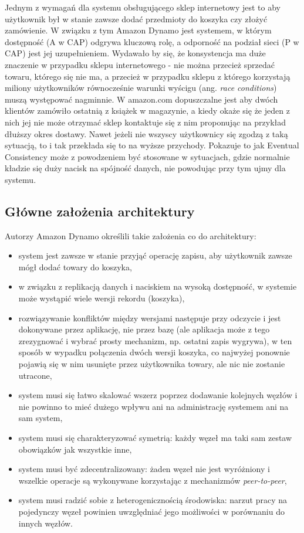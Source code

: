 Jednym z wymagań dla systemu obsługującego sklep internetowy jest to aby użytkownik był w stanie zawsze dodać przedmioty do koszyka czy złożyć zamówienie.
W związku z tym Amazon Dynamo jest systemem, w którym dostępność (A w CAP) odgrywa kluczową rolę, a odporność na podział sieci (P w CAP) jest jej uzupełnieniem.
Wydawało by się, że konsystencja ma duże znaczenie w przypadku sklepu internetowego - nie można przecież sprzedać towaru, którego się nie ma, a przecież w przypadku sklepu z którego korzystają miliony użytkowników równocześnie warunki wyścigu (ang. \emph{race conditions}) muszą występować nagminnie.
W amazon.com dopuszczalne jest aby dwóch klientów zamówiło ostatnią z książek w magazynie, a kiedy okaże się że jeden z nich jej nie może otrzymać sklep kontaktuje się z nim proponując na przykład dłuższy okres dostawy.
Nawet jeżeli nie wszyscy użytkownicy się zgodzą z taką sytuacją, to i tak przekłada się to na wyższe przychody.
Pokazuje to jak Eventual Consistency może z powodzeniem być stosowane w sytuacjach, gdzie normalnie kładzie się duży nacisk na spójność danych, nie powodując przy tym ujmy dla systemu.

\subsection*{Główne założenia architektury}

Autorzy Amazon Dynamo określili takie założenia co do architektury:

\begin{itemize}
 \item system jest zawsze w stanie przyjąć operację zapisu, aby użytkownik zawsze mógł dodać towary do koszyka,
 \item w związku z replikacją danych i naciskiem na wysoką dostępność, w systemie może wystąpić wiele wersji rekordu (koszyka),
 \item rozwiązywanie konfliktów między wersjami następuje przy odczycie i jest dokonywane przez aplikację, nie przez bazę (ale aplikacja może z tego zrezygnować i wybrać prosty mechanizm, np. ostatni zapis wygrywa), w ten sposób w wypadku połączenia dwóch wersji koszyka, co najwyżej ponownie pojawią się w nim usunięte przez użytkownika towary, ale nic nie zostanie utracone,
 \item system musi się łatwo skalować wszerz poprzez dodawanie kolejnych węzłów i nie powinno to mieć dużego wpływu ani na administrację systemem ani na sam system,
 \item system musi się charakteryzować symetrią: każdy węzeł ma taki sam zestaw obowiązków jak wszystkie inne,
 \item system musi być zdecentralizowany: żaden węzeł nie jest wyróżniony i wszelkie operacje są wykonywane korzystając z mechanizmów \emph{peer-to-peer},
 \item system musi radzić sobie z heterogenicznością środowiska: narzut pracy na pojedynczy węzeł powinien uwzględniać jego możliwości w porównaniu do innych węzłów.
\end{itemize}

